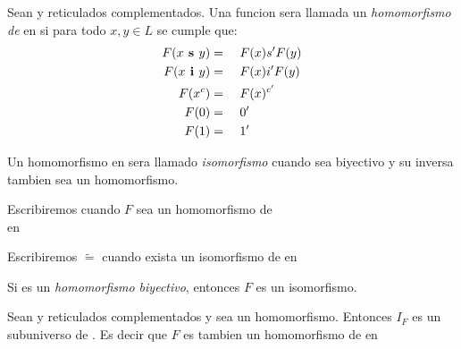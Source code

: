   \begin{definition}
    Sean \reticulCompl y  reticulados complementados. Una funcion
     sera llamada un \emph{homomorfismo de} \reticulCompl en 
    si para todo $x, y \in L$ se cumple que:
    \begin{alignat*}{4}
      F(x\textbf{ s }y) &=&\ & F(x) s' F(y)\\
      F(x\textbf{ i }y) &=&\ & F(x) i' F(y)\\
      F(x^c) &=&\ & F(x)^{c'}\\
      F(0) &=&\ & 0'\\
      F(1) &=&\ & 1'
    \end{alignat*}

    Un homomorfismo \reticulCompl en  sera llamado \emph{isomorfismo} cuando
    sea biyectivo y su inversa tambien sea un homomorfismo. 

    Escribiremos  cuando $F$ sea un homomorfismo de\\
    \reticulCompl en 

    Escribiremos \reticulCompl $\tilde{=}$  cuando exista
    un isomorfismo de \reticulCompl en 
  \end{definition}

  \begin{lemma}
    Si  es un \emph{homomorfismo biyectivo},
    entonces $F$ es un isomorfismo.
  \end{lemma}
  \noproof
  \begin{lemma}
    Sean \reticulCompl y  reticulados complementados y sea 
    un homomorfismo. Entonces $I_F$ es un subuniverso de . Es decir que $F$
    es tambien un homomorfismo de \reticulCompl en 
  \end{lemma}
  \noproof


